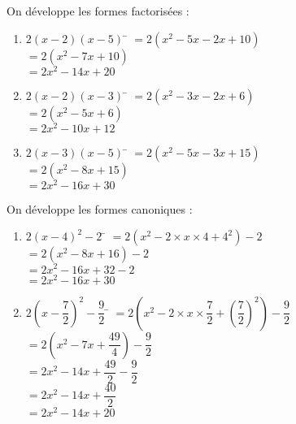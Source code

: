 \documentclass[a4paper,11pt,exos]{nsi} %
\begin{document}
\begin{multicols}{2}
    On développe les formes factorisées :
\begin{enumerate}[label=\textbullet]
    \item 	\begin{tabbing}
        $2(x-2)(x-5)$   \=  $=2\left(x^2-5x-2x+10\right)$\\
        \>  $=2\left(x^2-7x+10\right)$\\
        \>  $=2x^2-14x+20$
    \end{tabbing}
	\item 	\begin{tabbing}
        $2(x-2)(x-3)$   \=  $=2\left(x^2-3x-2x+6\right)$\\
        \>  $=2\left(x^2-5x+6\right)$\\
        \>  $=2x^2-10x+12$
    \end{tabbing}
	\item 	\begin{tabbing}
        $2(x-3)(x-5)$   \=  $=2\left(x^2-5x-3x+15\right)$\\
        \>  $=2\left(x^2-8x+15\right)$\\
        \>  $=2x^2-16x+30$
    \end{tabbing}
\end{enumerate}

    On développe les formes canoniques :
\begin{enumerate}[label=\textbullet]
    \item \begin{tabbing}
        $2\left(x-4\right)^2-2$ \=  $=2\left(x^2-2\times x\times 4+4^2\right)-2$\\
        \>  $=2\left(x^2-8x+16\right)-2$\\
        \>  $=2x^2-16x+32-2$\\
        \>  $=2x^2-16x+30$
    \end{tabbing}

    \item \begin{tabbing}
        $2\left(x-\dfrac{7}{2}\right)^2-\dfrac{9}{2}$   \=  $=2\left(x^2-2\times x\times \dfrac{7}{2}+\left(\dfrac{7}{2}\right)^2\right)-\dfrac{9}{2}$\\[.5em]
        \>  $=2\left(x^2-7x+\dfrac{49}{4}\right)-\dfrac{9}{2}$\\[.5em]
        \>  $=2x^2-14x+\dfrac{49}{2}-\dfrac{9}{2}$\\[.5em]
        \>  $=2x^2-14x+\dfrac{40}{2}$\\[.5em]
        \>  $=2x^2-14x+20$
    \end{tabbing}


\end{enumerate}
\end{multicols}
\end{document}
